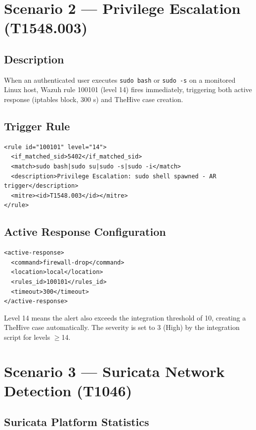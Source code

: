 \documentclass[12pt,a4paper]{report}
\begin{document}
\section{Scenario 2 --- Privilege Escalation (T1548.003)}

\subsection{Description}

When an authenticated user executes \texttt{sudo bash} or \texttt{sudo -s} on a monitored Linux host, Wazuh rule 100101 (level 14) fires immediately, triggering both active response (iptables block, 300 s) and TheHive case creation.

\subsection{Trigger Rule}

\begin{lstlisting}[style=xmlstyle, caption=Rule 100101 privilege escalation detection]
<rule id="100101" level="14">
  <if_matched_sid>5402</if_matched_sid>
  <match>sudo bash|sudo su|sudo -s|sudo -i</match>
  <description>Privilege Escalation: sudo shell spawned - AR trigger</description>
  <mitre><id>T1548.003</id></mitre>
</rule>
\end{lstlisting}

\subsection{Active Response Configuration}

\begin{lstlisting}[style=xmlstyle, caption=Active response for privilege escalation]
<active-response>
  <command>firewall-drop</command>
  <location>local</location>
  <rules_id>100101</rules_id>
  <timeout>300</timeout>
</active-response>
\end{lstlisting}

Level 14 means the alert also exceeds the integration threshold of 10, creating a TheHive case automatically. The severity is set to 3 (High) by the integration script for levels $\geq$14.

\section{Scenario 3 --- Suricata Network Detection (T1046)}

\subsection{Suricata Platform Statistics}
\end{document}
